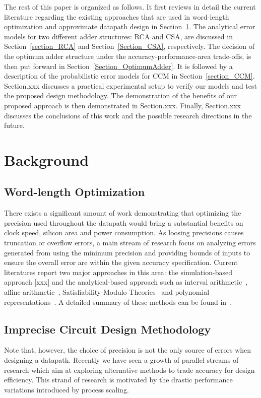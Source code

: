 \documentclass[journal]{IEEEtran}
\begin{document}
The rest of this paper is organized as follows. It first reviews in detail the current literature regarding the existing approaches that are used in word-length optimization and approximate datapath design in Section~\ref{Section_Background}. The analytical error models for two different adder structures: RCA and CSA, are discussed in Section~\ref{section_RCA} and Section~\ref{Section_CSA}, respectively. The decision of the optimum adder structure under the accuracy-performance-area trade-offs, is then put forward in Section~\ref{Section_OptimumAdder}. It is followed by a description of the probabilistic error models for CCM in Section~\ref{section_CCM}. Section.xxx discusses a practical experimental setup to verify our models and test the proposed design methodology. The demonstration of the benefits of our proposed approach is then demonstrated in Section.xxx. Finally, Section.xxx discusses the conclusions of this work and the possible research directions in the future.

\section{Background}\label{Section_Background}
\subsection{Word-length Optimization}\label{Section_Background_WL}
There exists a significant amount of work demonstrating that optimizing the precision used throughout the datapath would bring a substantial benefits on clock speed, silicon area and power consumption. As loosing precisions causes truncation or overflow errors, a main stream of research focus on analyzing errors generated from using the minimum precision and providing bounds of inputs to ensure the overall error are within the given accuracy specification. Current literatures report two major approaches in this area: the simulation-based approach [xxx] and the analytical-based approach such as interval arithmetic~\cite{moore1966IA}, affine arithmetic~\cite{de2004affine}, Satisfiability-Modulo Theories~\cite{SAT2010} and polynomial representations~\cite{Boland2011TCAD}. A detailed summary of these methods can be found in~\cite{GeorgeDT11, lee2006accuracy}.

\subsection{Imprecise Circuit Design Methodology}\label{Section_Background_Imprecise}
Note that, however, the choice of precision is not the only source of errors when designing a datapath. Recently we have seen a growth of parallel streams of research which aim at exploring alternative methods to trade accuracy for design efficiency. This strand of research is motivated by the drastic performance variations introduced by process scaling.
\end{document}
